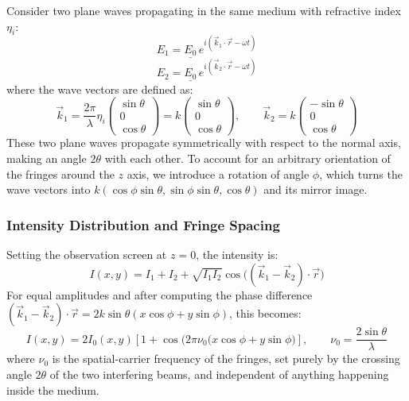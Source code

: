 Consider two plane waves propagating in the same medium with refractive index $\eta_i$:
\begin{equation}
E_1 = \underline{E_0} \, e^{i(\vec{k}_1 \cdot \vec{r} - \omega t)}
\end{equation}
\begin{equation}
E_2 = \underline{E_0} \, e^{i(\vec{k}_2 \cdot \vec{r} - \omega t)}
\end{equation}
where the wave vectors are defined as:
\begin{equation}
\vec{k}_1 = \frac{2\pi}{\lambda}\eta_i \begin{pmatrix}\sin{\theta}\\0\\\cos{\theta}\end{pmatrix} = k \begin{pmatrix}\sin{\theta}\\0\\\cos{\theta}\end{pmatrix}, \qquad
\vec{k}_2 = k \begin{pmatrix}-\sin{\theta}\\0\\\cos{\theta}\end{pmatrix}
\end{equation}
These two plane waves propagate symmetrically with respect to the normal axis, making an angle $2\theta$ with each other. To account for an arbitrary orientation of the fringes around the $z$ axis, we introduce a rotation of angle $\phi$, which turns the wave vectors into $k(\cos\phi\sin\theta,\sin\phi\sin\theta,\cos\theta)$ and its mirror image.

\subsubsection{Intensity Distribution and Fringe Spacing}

Setting the observation screen at $z=0$, the intensity is:
\begin{equation}
I(x,y) = I_1 + I_2 + \sqrt{I_1I_2} \cos\big((\vec{k}_1 - \vec{k}_2) \cdot \vec{r}\big)
\end{equation}
For equal amplitudes and after computing the phase difference $(\vec{k}_1-\vec{k}_2)\cdot\vec{r} = 2k\sin\theta(x\cos\phi+y\sin\phi)$, this becomes:
\begin{equation}
\boxed{I(x,y) = 2I_0(x,y)\left[1 + \cos\big(2\pi \nu_0(x\cos{\phi}+y\sin{\phi}\big)\right]}, \qquad \nu_0 = \frac{2\sin\theta}{\lambda}
\label{eq:carrier_freq}
\end{equation}
where $\nu_0$ is the spatial-carrier frequency of the fringes, set purely by the crossing angle $2\theta$ of the two interfering beams, and independent of anything happening inside the medium.

